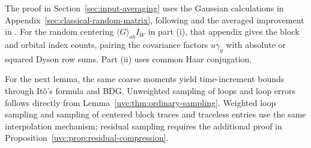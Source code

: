 \documentclass[11pt]{article}
\numberwithin{equation}{section}
\theoremstyle{remark}
\begin{document}
The proof in Section~\ref{sec:input-averaging} uses the Gaussian
calculations in Appendix~\ref{sec:classical-random-matrix}, following
\cite[(6.40), (6.50)]{TYY} and the averaged improvement in
\cite[proof of (4.5), (4.12)]{YY}.
For the random centering $\langle G\rangle_{ab}I_W$ in part (i),
that appendix gives the block and orbital index counts, pairing the
covariance factors $u\gamma_g$ with absolute or squared Dyson row sums.
Part (ii) uses common Haar conjugation.

For the next lemma, the same coarse moments yield time-increment bounds
through It\^o's formula and BDG. Unweighted sampling of loops and loop
errors follows directly from Lemma~\ref{uvc:thm:ordinary-sampling}.
Weighted loop sampling and sampling of centered block traces and
traceless entries use the same interpolation mechanism; residual sampling
requires the additional proof in
Proposition~\ref{uvc:prop:residual-compression}.
\end{document}

